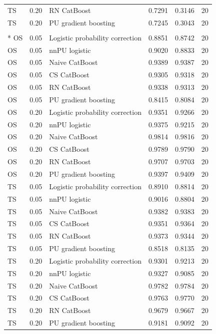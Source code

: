 \begin{longtable}{@{}p{0.65in}rp{2.85in}rrr@{}}
TS & 0.20 & RN CatBoost & 0.7291 & 0.3146 & 20 \\
TS & 0.20 & PU gradient boosting & 0.7245 & 0.3043 & 20 \\
\addlinespace[2pt]
\pagebreak
\multicolumn{6}{l}{\textbf{Optical Digits}}\\*
OS & 0.05 & Logistic probability correction & 0.8851 & 0.8742 & 20 \\
OS & 0.05 & nnPU logistic & 0.9020 & 0.8833 & 20 \\
OS & 0.05 & Naive CatBoost & 0.9389 & 0.9387 & 20 \\
OS & 0.05 & CS CatBoost & 0.9305 & 0.9318 & 20 \\
OS & 0.05 & RN CatBoost & 0.9338 & 0.9313 & 20 \\
OS & 0.05 & PU gradient boosting & 0.8415 & 0.8084 & 20 \\
\addlinespace[2pt]
OS & 0.20 & Logistic probability correction & 0.9351 & 0.9266 & 20 \\
OS & 0.20 & nnPU logistic & 0.9375 & 0.9215 & 20 \\
OS & 0.20 & Naive CatBoost & 0.9814 & 0.9816 & 20 \\
OS & 0.20 & CS CatBoost & 0.9789 & 0.9790 & 20 \\
OS & 0.20 & RN CatBoost & 0.9707 & 0.9703 & 20 \\
OS & 0.20 & PU gradient boosting & 0.9397 & 0.9409 & 20 \\
\addlinespace[2pt]
TS & 0.05 & Logistic probability correction & 0.8910 & 0.8814 & 20 \\
TS & 0.05 & nnPU logistic & 0.9016 & 0.8804 & 20 \\
TS & 0.05 & Naive CatBoost & 0.9382 & 0.9383 & 20 \\
TS & 0.05 & CS CatBoost & 0.9351 & 0.9364 & 20 \\
TS & 0.05 & RN CatBoost & 0.9373 & 0.9344 & 20 \\
TS & 0.05 & PU gradient boosting & 0.8518 & 0.8135 & 20 \\
\addlinespace[2pt]
TS & 0.20 & Logistic probability correction & 0.9301 & 0.9213 & 20 \\
TS & 0.20 & nnPU logistic & 0.9327 & 0.9085 & 20 \\
TS & 0.20 & Naive CatBoost & 0.9782 & 0.9784 & 20 \\
TS & 0.20 & CS CatBoost & 0.9763 & 0.9770 & 20 \\
TS & 0.20 & RN CatBoost & 0.9679 & 0.9667 & 20 \\
TS & 0.20 & PU gradient boosting & 0.9181 & 0.9092 & 20 \\

\end{longtable}
